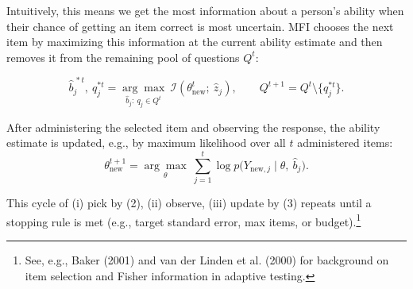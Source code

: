 \documentclass{article}
\begin{document}
Intuitively, this means we get the most information about a person's ability when their chance of getting an item correct is most uncertain. MFI chooses the next item by maximizing this information at the current ability estimate and then removes it from the remaining pool of questions $Q^t$:

\[
\hat b^{\,*t}_j,\ q^{*t}_j
= \underset{\hat b_j:\ q_j\in Q^t}{\arg\max}\ \mathcal I\!\left(\theta^{t}_{\text{new}};\ \hat z_j\right),
\qquad
Q^{t+1} = Q^t\setminus\{q^{*t}_j\}.
\tag{2}
\]

After administering the selected item and observing the response, the ability estimate is
updated, e.g., by maximum likelihood over all $t$ administered items:
\[
\theta^{t+1}_{\text{new}}
= \underset{\theta}{\arg\max}\ \sum_{j=1}^{t} \log p\big(Y_{\text{new},j}\mid \theta,\ \hat b_j\big).
\tag{3}
\]

This cycle of (i) pick by (2), (ii) observe, (iii) update by (3) repeats until a stopping
rule is met (e.g., target standard error, max items, or budget).\footnote{See, e.g.,
Baker (2001) and van der Linden et al. (2000) for background on item selection and Fisher
information in adaptive testing.}
\end{document}
